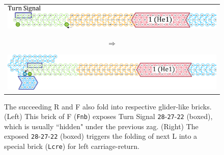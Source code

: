 \documentclass[twocolumn]{svjour3}
\begin{document}
\begin{figure}[tb]
\centering
\begin{tabular}{c}
 \begin{minipage}{0.45\linewidth}
 
\centering
\includegraphics[width=\linewidth]{fig/svg/CounterEx17_3.pdf}

\end{minipage}
\begin{minipage}{0.05\linewidth}
\centering
{\large $\Rightarrow$}
\end{minipage}
 \begin{minipage}{0.5\linewidth}

\centering
\includegraphics[width=\linewidth]{fig/svg/CounterEx18_2.pdf}

\end{minipage}
\end{tabular}

\caption{
The succeeding R and F also fold into respective glider-like bricks.
(Left) This brick of F (\texttt{Fnb}) exposes Turn Signal \texttt{28}{-}\texttt{27}{-}\texttt{22} (boxed), which is usually ``hidden" under the previous zag.
(Right) The exposed \texttt{28}{-}\texttt{27}{-}\texttt{22} (boxed) triggers the folding of next L into a special brick (\texttt{Lcre}) for left carriage-return.
}
\label{fig:overflowex4}
\end{figure}
\end{document}

